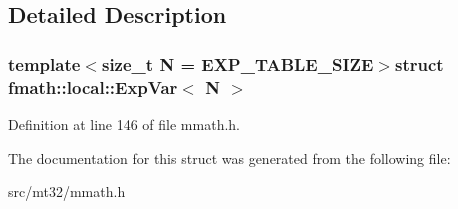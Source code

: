 \subsection{Detailed Description}
\subsubsection*{template$<$size\-\_\-t N = E\-X\-P\-\_\-\-T\-A\-B\-L\-E\-\_\-\-S\-I\-Z\-E$>$struct fmath\-::local\-::\-Exp\-Var$<$ N $>$}



Definition at line 146 of file mmath.\-h.



The documentation for this struct was generated from the following file\-:\begin{DoxyCompactItemize}
\item 
src/mt32/mmath.\-h\end{DoxyCompactItemize}
